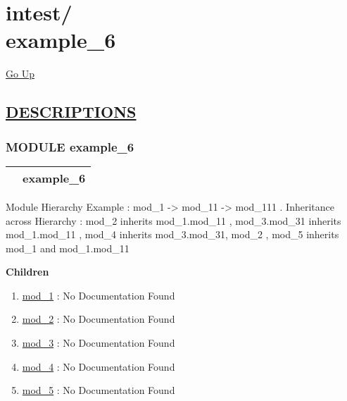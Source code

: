 \chapter*{\color{headfile}
{\large intest\slash\hspace{0pt}}
 \\
example_6
}
\hypertarget{ecldoc:toc:intest.example_6}{}
\hyperlink{ecldoc:toc:root/intest}{Go Up}


\section*{\underline{\textsf{DESCRIPTIONS}}}
\subsection*{\textsf{\colorbox{headtoc}{\color{white} MODULE}
example\_6}}

\hypertarget{ecldoc:intest.example_6}{}

{\renewcommand{\arraystretch}{1.5}
\begin{tabularx}{\textwidth}{|>{\raggedright\arraybackslash}l|X|}
\hline
\hspace{0pt}\mytexttt{\color{red} } & \textbf{example\_6} \\
\hline
\end{tabularx}
}

\par





Module Hierarchy Example : mod\_1 -> mod\_11 -> mod\_111 . Inheritance across Hierarchy : mod\_2 inherits mod\_1.mod\_11 , mod\_3.mod\_31 inherits mod\_1.mod\_11 , mod\_4 inherits mod\_3.mod\_31, mod\_2 , mod\_5 inherits mod\_1 and mod\_1.mod\_11







\textbf{Children}
\begin{enumerate}
\item \hyperlink{ecldoc:intest.example_6.mod_1}{mod\_1}
: No Documentation Found
\item \hyperlink{ecldoc:intest.example_6.mod_2}{mod\_2}
: No Documentation Found
\item \hyperlink{ecldoc:intest.example_6.mod_3}{mod\_3}
: No Documentation Found
\item \hyperlink{ecldoc:intest.example_6.mod_4}{mod\_4}
: No Documentation Found
\item \hyperlink{ecldoc:intest.example_6.mod_5}{mod\_5}
: No Documentation Found
\end{enumerate}

